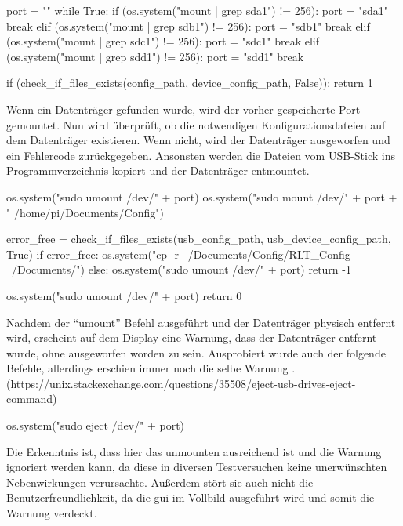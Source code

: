 \begin{pythoncode}
	port = ""
	while True:
		if (os.system("mount | grep sda1") != 256):
			port = "sda1"
			break
		elif (os.system("mount | grep sdb1") != 256):
			port = "sdb1"
			break
		elif (os.system("mount | grep sdc1") != 256):
			port = "sdc1"
			break
		elif (os.system("mount | grep sdd1") != 256):
			port = "sdd1"
			break
		
		if (check_if_files_exists(config_path, device_config_path, False)):
			return 1
\end{pythoncode}

Wenn ein Datenträger gefunden wurde, wird der vorher gespeicherte Port gemountet. Nun wird überprüft, ob die notwendigen Konfigurationsdateien auf dem Datenträger existieren. Wenn nicht, wird der Datenträger ausgeworfen und ein Fehlercode zurückgegeben. Ansonsten werden die Dateien vom USB-Stick ins Programmverzeichnis kopiert und der Datenträger entmountet. 
\begin{pythoncode}
	os.system("sudo umount /dev/" + port)
	os.system("sudo mount /dev/" + port + " /home/pi/Documents/Config")
	
	error_free = check_if_files_exists(usb_config_path, usb_device_config_path, True)
	if error_free:
		os.system("cp -r ~/Documents/Config/RLT_Config ~/Documents/")
	else:
		os.system("sudo umount /dev/" + port)
		return -1
		
	os.system("sudo umount /dev/" + port)
	return 0
\end{pythoncode}

Nachdem der \enquote{umount} Befehl ausgeführt und der Datenträger physisch entfernt wird, erscheint auf dem Display eine Warnung, dass der Datenträger entfernt wurde, ohne ausgeworfen worden zu sein. Ausprobiert wurde auch der folgende Befehle, allerdings erschien immer noch die selbe Warnung \cite{}. (https://unix.stackexchange.com/questions/35508/eject-usb-drives-eject-command)
\begin{pythoncode}
	os.system("sudo eject /dev/" + port)
\end{pythoncode}
Die Erkenntnis ist, dass hier das unmounten ausreichend ist und die Warnung ignoriert werden kann, da diese in diversen Testversuchen keine unerwünschten Nebenwirkungen verursachte. Außerdem stört sie auch nicht die Benutzerfreundlichkeit, da die \acs{gui} im Vollbild ausgeführt wird und somit die Warnung verdeckt.


